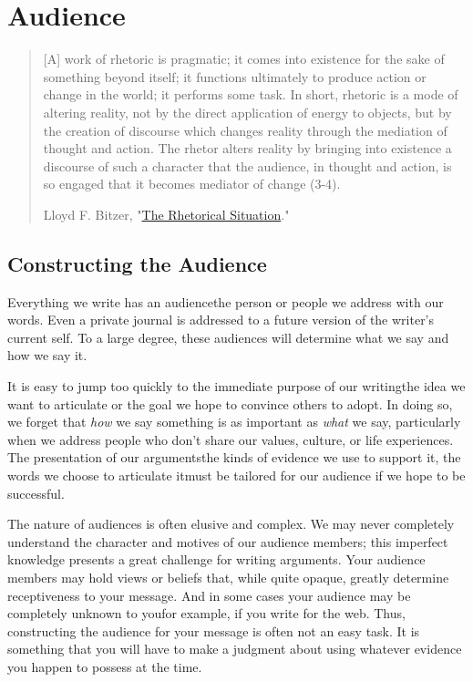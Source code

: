 \hypertarget{audience}{}

\chapter{Audience}

\begin{quote} \small [A] work of rhetoric is pragmatic; it comes into existence
for the sake of something beyond itself; it functions ultimately to produce
action or change in the world; it performs some task. In short, rhetoric is a
mode of altering reality, not by the direct application of energy to objects,
but by the creation of discourse which changes reality through the mediation of
thought and action. The rhetor alters reality by bringing into existence a
discourse of such a character that the audience, in thought and action, is so
engaged that it becomes mediator of change (3-4).

\textemdash Lloyd F. Bitzer, "\href{http://www.jstor.org/stable/40593346}{The
Rhetorical Situation}." \end{quote}

\section{Constructing the Audience}

Everything we write has an audience\textemdash the person or people we address
with our words. Even a private journal is addressed to a future version of the
writer's current self. To a large degree, these audiences will determine what we say and how we say it.

It is easy to jump too quickly to the immediate purpose of our
writing\textemdash the idea we want to articulate or the goal we hope to
convince others to adopt. In doing so, we forget that \emph{how} we say
something is as important as \emph{what} we say, particularly when we address
people who don't share our values, culture, or life experiences. The presentation of our
arguments\textemdash the kinds of evidence we use to support it, the words we
choose to articulate it\textemdash must be tailored for our audience if we hope
to be successful.

The nature of audiences is often elusive and complex. We may never completely understand the character and motives of our audience members; this imperfect knowledge presents a great challenge for writing arguments. Your audience members may hold views or beliefs that, while quite opaque, greatly determine receptiveness to your message. And in some cases your audience may be completely unknown to you\textemdash for example, if you write for the web. Thus, constructing the audience for your message is often not an easy task. It is something that you will have to make a judgment about using whatever evidence you happen to possess at the time. 

